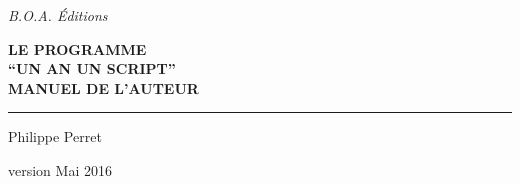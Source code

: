 
\begin{titlepage}
	\begin{center}\LARGE
		\textit{B.O.A. Éditions}
	\end{center}
	\selectfont

	\begin{flushleft}\huge\bfseries
    LE PROGRAMME \\
    \enquote{UN AN UN SCRIPT} \\
		{\small MANUEL DE L'AUTEUR}
	\end{flushleft}

	\hrule

	\begin{flushright}
		Philippe Perret
	\end{flushright}

	\begin{flushleft}\itshape\small
	\end{flushleft}
	
	\begin{center}
    version Mai 2016
	\end{center}
\end{titlepage}

